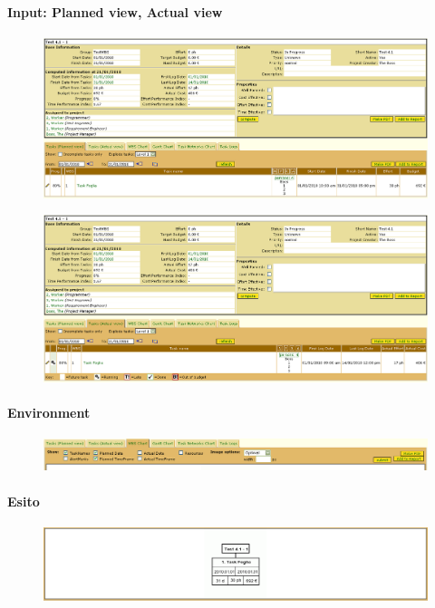 \paragraph{Input: Planned view, Actual view}
\begin{figure}[h!]
\centering
\includegraphics[width=\textwidth]{tests/TEST_WBS/4.1/4.1_1/Esempio_2/input.png}
\end{figure}
\begin{figure}[h!]
\centering
\includegraphics[width=\textwidth]{tests/TEST_WBS/4.1/4.1_1/Esempio_2/input_actual.png}
\end{figure}
\newpage

\paragraph{Environment}
\begin{figure}[h!]
\centering
\includegraphics[width=\textwidth]{tests/TEST_WBS/4.1/4.1_1/Esempio_2/environment.png}
\end{figure}

\paragraph{Esito}
\begin{figure}[h!]
\centering
\includegraphics[width=\textwidth]{tests/TEST_WBS/4.1/4.1_1/Esempio_2/output.png}
\end{figure}
\newpage



